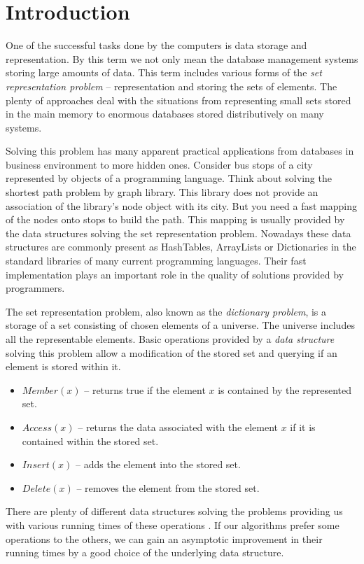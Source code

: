 \chapter{Introduction}
One of the successful tasks done by the computers is data storage and representation. By this term we not only mean the database management systems storing large amounts of data. This term includes various forms of the \emph{set representation problem} \cite{VK-skripta} -- representation and storing the sets of elements. The plenty of approaches deal with the situations from representing small sets stored in the main memory to enormous databases stored distributively on many systems.

Solving this problem has many apparent practical applications from databases in business environment to more hidden ones. Consider bus stops of a city represented by objects of a programming language. Think about solving the shortest path problem by graph library. This library does not provide an association of the library's node object with its city. But you need a fast mapping of the nodes onto stops to build the path. This mapping is usually provided by the data structures solving the set representation problem. Nowadays these data structures are commonly present as HashTables, ArrayLists or Dictionaries in the standard libraries of many current programming languages. Their fast implementation plays an important role in the quality of solutions provided by programmers.

The set representation problem, also known as the \emph{dictionary problem}, is a storage of a set consisting of chosen elements of a universe. The universe includes all the representable elements. Basic operations provided by a \emph{data structure} solving this problem allow a modification of the stored set and querying if an element is stored within it.

\begin{itemize}
\item $Member(x)$ -- returns true if the element $x$ is contained by the represented set.
\item $Access(x)$ -- returns the data associated with the element $x$ if it is contained within the stored set.
\item $Insert(x)$ -- adds the element into the stored set.
\item $Delete(x)$ -- removes the element from the stored set.
\end{itemize}

There are plenty of different data structures solving the problems providing us with various running times of these operations \cite{Cormen01introductionto}. If our algorithms prefer some operations to the others, we can gain an asymptotic improvement in their running times by a good choice of the underlying data structure. 

